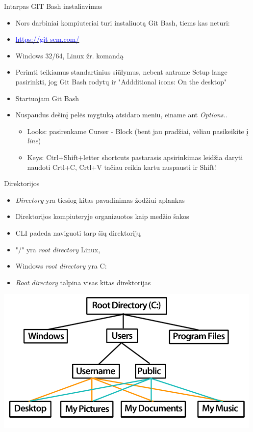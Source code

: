 \documentclass[11pt,xcolor=table]{beamer}
\begin{document}
\begin{frame}{Intarpas GIT Bash instaliavimas}
\begin{itemize}
\item Nors darbiniai kompiuteriai turi instaliuotą Git Bash, tiems kas neturi:
\item \href{https://git-scm.com/}{\textcolor{blue}{https://git-scm.com/}}
\item Windows 32/64, Linux žr. komandą
\item Perimti teikiamus standartinius siūlymus, nebent antrame Setup lange pasirinkti, jog Git Bash rodytų ir "Addditional icons: On the desktop"
\item Startuojam Git Bash
\item Nuspaudus dešinį pelės mygtuką atsidaro meniu, einame ant \textit{Options..}
\begin{itemize}
\item Looks: pasirenkame Curser - Block (bent jau pradžiai, vėliau pasikeikite į \textit{line})
\item Keys: Ctrl+Shift+letter shortcuts pastarasis apsirinkimas leidžia daryti  naudoti Crtl+C, Crtl+V tačiau reikia kartu nuspausti ir Shift!
\end{itemize} 
\end{itemize}
\end{frame}
\begin{frame}{Direktorijos}
\begin{itemize}
\item \textit{Directory} yra tiesiog kitas pavadinimas žodžiui aplankas
\item Direktorijos kompiuteryje organizuotos kaip medžio šakos
\item CLI padeda naviguoti tarp šių direktorijų
\item "/" yra \textit{root directory} Linux, 
\item Windows \textit{root directory} yra C:
\item \textit{Root directory} talpina visas kitas direktorijas
\end{itemize}
\center
\includegraphics[scale=1.5]{diagram_directory_win.png}
\end{frame}
\end{document}
